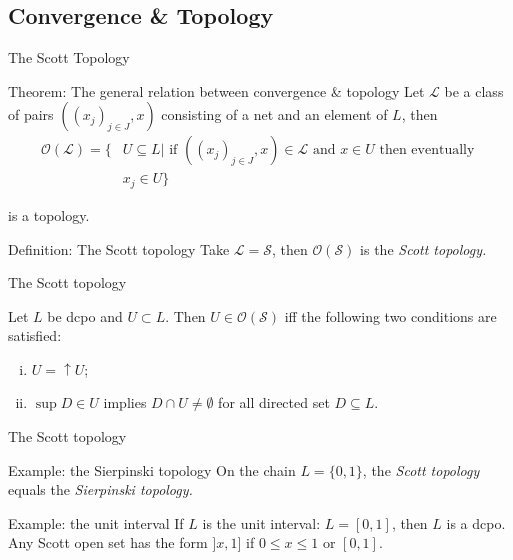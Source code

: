 \documentclass{beamer}
\begin{document}
\subsection{Convergence \& Topology}
\begin{frame}{The Scott Topology}
\begin{block}{Theorem: The general relation between convergence \& topology}
Let $\mathcal{L}$ be a class of pairs $((x_j)_{j\in J}, x)$ consisting of a net and an element of $L$, then
\begin{align*}
\mathcal{O}(\mathcal{L}) = \{&U \subseteq L | \text{ if } ((x_j)_{j\in J}, x) \in \mathcal{L} \text{ and } x \in U \text{ then eventually } \\
&x_j \in U\}
\end{align*}

is a topology.
\end{block}
\begin{block}{Definition: The Scott topology}
Take $\mathcal{L} = \mathcal{S}$, then $\mathcal{O}(\mathcal{S})$ is the \emph{Scott topology.}
\end{block}
\end{frame}

\begin{frame}{The Scott topology}
\begin{theorem}\label{scottprot} Let $L$ be dcpo and $U \subset L$. Then $U \in \mathcal{O}(\mathcal{S})$ iff the following two conditions are satisfied:
\begin{enumerate}[(i)]
    \item $U = \uparrow U$;
    \item $\sup D \in U$ implies $D \cap U \neq \emptyset$ for all directed set $D \subseteq L$.
\end{enumerate}
\end{theorem}

\end{frame}
\begin{frame}{The Scott topology}
\begin{block}{Example: the Sierpinski topology}
On the chain $L = \{0, 1\}$, the \emph{Scott topology} equals the \emph{Sierpinski topology.}
\end{block}
\begin{block}{Example: the unit interval}
If $L$ is the unit interval: $L = [0,1]$, then $L$ is a dcpo.  Any Scott open set has the form $]x,1]$ if $0 \leq x \leq 1$ or $[0, 1]$.
\end{block}
\end{frame}
\end{document}
